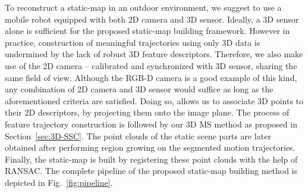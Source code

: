 \documentclass[10pt,twocolumn,letterpaper]{article}  %
\begin{document}
To reconstruct a static-map in an outdoor environment, we suggest to use a mobile robot equipped with both 2D camera and 3D sensor. Ideally, a 3D sensor alone is sufficient for the proposed static-map building framework. However in practice, construction of meaningful trajectories using only 3D data is undermined by the lack of robust 3D feature descriptors. Therefore, we also make use of the 2D camera -- calibrated and synchronized with 3D sensor, sharing the same field of view. Although the RGB-D camera is a good example of this kind, any combination of 2D camera and 3D sensor would suffice as long as the aforementioned criteria are satisfied. Doing so, allows us to associate 3D points to their 2D descriptors, by projecting them  onto the image plane. The process of feature trajectory construction is followed by our 3D MS method as proposed in Section~\ref{sec:3D-SSC}. The point clouds of the static scene parts are later obtained after performing region growing on the segmented motion trajectories. Finally, the static-map is built by registering these point clouds with the help of RANSAC. The complete pipeline of the proposed static-map building method is depicted in Fig.~\ref{fig:pipeline}.   
   
 
  
\end{document}
